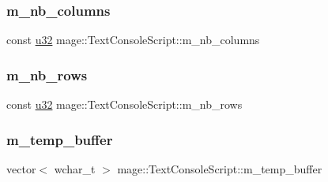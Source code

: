 \hypertarget{classmage_1_1_text_console_script_a9dc2fbd08ed85b4b79ab2426e0bfa411}{}\label{classmage_1_1_text_console_script_a9dc2fbd08ed85b4b79ab2426e0bfa411} 
\subsubsection{\texorpdfstring{m\+\_\+nb\+\_\+columns}{m\_nb\_columns}}
{\footnotesize\ttfamily const \hyperlink{namespacemage_af2b398bf98eb10351f49cad73fe2cc73}{u32} mage\+::\+Text\+Console\+Script\+::m\+\_\+nb\+\_\+columns\hspace{0.3cm}{\ttfamily [private]}}

\hypertarget{classmage_1_1_text_console_script_ae88a050607f3bc7b3f1c0a10c79a3b9d}{}\label{classmage_1_1_text_console_script_ae88a050607f3bc7b3f1c0a10c79a3b9d} 
\subsubsection{\texorpdfstring{m\+\_\+nb\+\_\+rows}{m\_nb\_rows}}
{\footnotesize\ttfamily const \hyperlink{namespacemage_af2b398bf98eb10351f49cad73fe2cc73}{u32} mage\+::\+Text\+Console\+Script\+::m\+\_\+nb\+\_\+rows\hspace{0.3cm}{\ttfamily [private]}}

\hypertarget{classmage_1_1_text_console_script_a6500bfd006f5c90d05f3da7f3e8e75a8}{}\label{classmage_1_1_text_console_script_a6500bfd006f5c90d05f3da7f3e8e75a8} 
\subsubsection{\texorpdfstring{m\+\_\+temp\+\_\+buffer}{m\_temp\_buffer}}
{\footnotesize\ttfamily vector$<$ wchar\+\_\+t $>$ mage\+::\+Text\+Console\+Script\+::m\+\_\+temp\+\_\+buffer\hspace{0.3cm}{\ttfamily [private]}}

